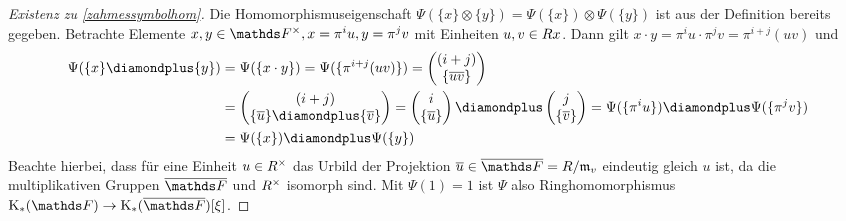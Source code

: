 \documentclass[ngerman,fontsize=11pt, paper=a4, parskip=half, titlepage=true, toc=bib]{scrartcl}
\begin{document}
\begin{proof}[Existenz zu \ref{zahmessymbolhom}]
  Die Homomorphismuseigenschaft
  $\Psi(\{x\}\otimes\{y\})=\Psi(\{x\})\otimes\Psi(\{y\})$
  ist aus der Definition bereits gegeben.
  Betrachte Elemente $x,y\in\Fx, x=\pi^iu, y=\pi^jv$ mit Einheiten
  $u,v\in\\Rx$. 
  Dann gilt $x\cdot y=\pi^iu\cdot\pi^jv=\pi^{i+j}(uv)$  und
  \begin{align*}
    \Psi(\{x\}\p\{y\})
    &=\Psi(\{x\cdot y\})=\Psi(\{\pi^{i+j}(uv)\})
      =\begin{pmatrix}(i+j)\\\{\ov{uv}\}\end{pmatrix}\\
    &=\begin{pmatrix}(i+j)\\\{\ov u \}\p \{\ov v\}\end{pmatrix}
    = \begin{pmatrix}i\\\{\ov u\}\end{pmatrix}
    \p\begin{pmatrix}j\\\{\ov v\}\end{pmatrix}
    =\Psi(\{\pi^iu\})\p \Psi(\{\pi^jv\})\\
    &= \Psi(\{x\})\p\Psi(\{y\})
  \end{align*}
  Beachte hierbei, dass für eine Einheit $u\in R^\times$ das Urbild
  der Projektion $\ov u\in\bF=R/\frakm_v$ eindeutig gleich $u$ ist,
  da die multiplikativen Gruppen $\bF$ und $R^\times$ isomorph sind.
  Mit $\Psi(1)=1$ ist $\Psi$ also Ringhomomorphismus $\KF\to\KbF[\xi]$.


\end{proof}
\end{document}
